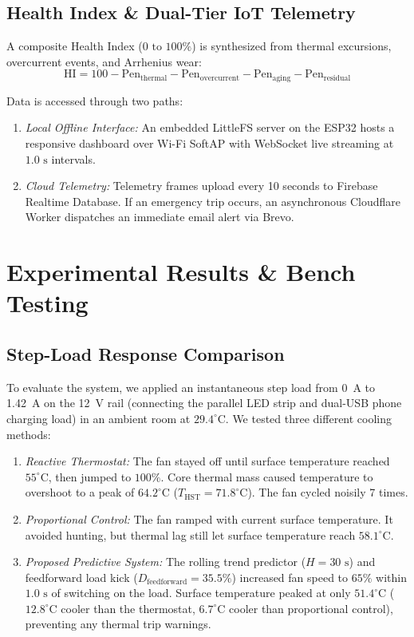 \documentclass[conference]{IEEEtran}
\begin{document}
\subsection{Health Index \& Dual-Tier IoT Telemetry}
A composite Health Index ($0\text{ to }100\%$) is synthesized from thermal excursions, overcurrent events, and Arrhenius wear:
\begin{equation}
\text{HI} = 100 - \text{Pen}_{\text{thermal}} - \text{Pen}_{\text{overcurrent}} - \text{Pen}_{\text{aging}} - \text{Pen}_{\text{residual}}
\end{equation}

Data is accessed through two paths:
\begin{enumerate}
    \item \textit{Local Offline Interface:} An embedded LittleFS server on the ESP32 hosts a responsive dashboard over Wi-Fi SoftAP with WebSocket live streaming at $1.0\text{ s}$ intervals.
    \item \textit{Cloud Telemetry:} Telemetry frames upload every 10 seconds to Firebase Realtime Database. If an emergency trip occurs, an asynchronous Cloudflare Worker dispatches an immediate email alert via Brevo.
\end{enumerate}

\section{Experimental Results \& Bench Testing}

\subsection{Step-Load Response Comparison}
To evaluate the system, we applied an instantaneous step load from 0~A to 1.42~A on the 12~V rail (connecting the parallel LED strip and dual-USB phone charging load) in an ambient room at $29.4^\circ\text{C}$. We tested three different cooling methods:
\begin{enumerate}
    \item \textit{Reactive Thermostat:} The fan stayed off until surface temperature reached $55^\circ\text{C}$, then jumped to $100\%$. Core thermal mass caused temperature to overshoot to a peak of $64.2^\circ\text{C}$ ($T_{\text{HST}} = 71.8^\circ\text{C}$). The fan cycled noisily 7 times.
    \item \textit{Proportional Control:} The fan ramped with current surface temperature. It avoided hunting, but thermal lag still let surface temperature reach $58.1^\circ\text{C}$.
    \item \textit{Proposed Predictive System:} The rolling trend predictor ($H = 30\text{ s}$) and feedforward load kick ($D_{\text{feedforward}} = 35.5\%$) increased fan speed to $65\%$ within $1.0\text{ s}$ of switching on the load. Surface temperature peaked at only $51.4^\circ\text{C}$ ($12.8^\circ\text{C}$ cooler than the thermostat, $6.7^\circ\text{C}$ cooler than proportional control), preventing any thermal trip warnings.
\end{enumerate}
\end{document}
